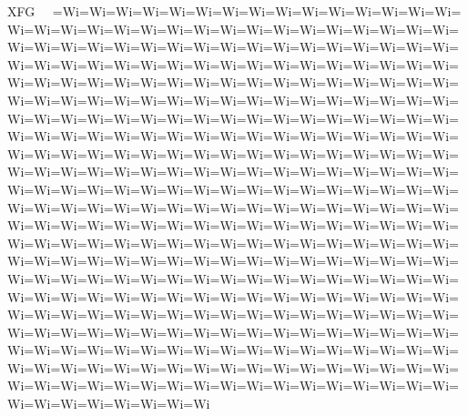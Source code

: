 XFG                        =Wi =Wi =Wi =Wi =Wi =Wi =Wi =Wi =Wi =Wi =Wi =Wi =Wi =Wi =Wi =Wi =Wi =Wi =Wi =Wi =Wi =Wi =Wi =Wi =Wi =Wi =Wi =Wi =Wi =Wi =Wi =Wi =Wi =Wi =Wi =Wi =Wi =Wi =Wi =Wi =Wi =Wi =Wi =Wi =Wi =Wi =Wi =Wi =Wi =Wi =Wi =Wi =Wi =Wi =Wi =Wi =Wi =Wi =Wi =Wi =Wi =Wi =Wi =Wi =Wi =Wi =Wi =Wi =Wi =Wi =Wi =Wi =Wi =Wi =Wi =Wi =Wi =Wi =Wi =Wi =Wi =Wi =Wi =Wi =Wi =Wi =Wi =Wi =Wi =Wi =Wi =Wi =Wi =Wi =Wi =Wi =Wi =Wi =Wi =Wi =Wi =Wi =Wi =Wi =Wi =Wi =Wi =Wi =Wi =Wi =Wi =Wi =Wi =Wi =Wi =Wi =Wi =Wi =Wi =Wi =Wi =Wi =Wi =Wi =Wi =Wi =Wi =Wi =Wi =Wi =Wi =Wi =Wi =Wi =Wi =Wi =Wi =Wi =Wi =Wi =Wi =Wi =Wi =Wi =Wi =Wi =Wi =Wi =Wi =Wi =Wi =Wi =Wi =Wi =Wi =Wi =Wi =Wi =Wi =Wi =Wi =Wi =Wi =Wi =Wi =Wi =Wi =Wi =Wi =Wi =Wi =Wi =Wi =Wi =Wi =Wi =Wi =Wi =Wi =Wi =Wi =Wi =Wi =Wi =Wi =Wi =Wi =Wi =Wi =Wi =Wi =Wi =Wi =Wi =Wi =Wi =Wi =Wi =Wi =Wi =Wi =Wi =Wi =Wi =Wi =Wi =Wi =Wi =Wi =Wi =Wi =Wi =Wi =Wi =Wi =Wi =Wi =Wi =Wi =Wi =Wi =Wi =Wi =Wi =Wi =Wi =Wi =Wi =Wi =Wi =Wi =Wi =Wi =Wi =Wi =Wi =Wi =Wi =Wi =Wi =Wi =Wi =Wi =Wi =Wi =Wi =Wi =Wi =Wi =Wi =Wi =Wi =Wi =Wi =Wi =Wi =Wi =Wi =Wi =Wi =Wi =Wi =Wi =Wi =Wi =Wi =Wi =Wi =Wi =Wi =Wi =Wi =Wi =Wi =Wi =Wi =Wi =Wi =Wi =Wi =Wi =Wi =Wi =Wi =Wi =Wi =Wi =Wi =Wi =Wi =Wi =Wi =Wi =Wi =Wi =Wi =Wi =Wi =Wi =Wi =Wi =Wi =Wi =Wi =Wi =Wi =Wi =Wi =Wi =Wi =Wi =Wi =Wi =Wi =Wi =Wi =Wi =Wi =Wi =Wi =Wi =Wi =Wi =Wi =Wi =Wi =Wi =Wi =Wi =Wi =Wi =Wi =Wi =Wi =Wi =Wi =Wi =Wi =Wi =Wi =Wi =Wi =Wi =Wi =Wi =Wi =Wi =Wi =Wi =Wi =Wi =Wi =Wi =Wi =Wi =Wi =Wi =Wi =Wi =Wi =Wi =Wi =Wi =Wi =Wi =Wi =Wi =Wi =Wi =Wi =Wi =Wi =Wi =Wi =Wi =Wi =Wi =Wi =Wi =Wi 